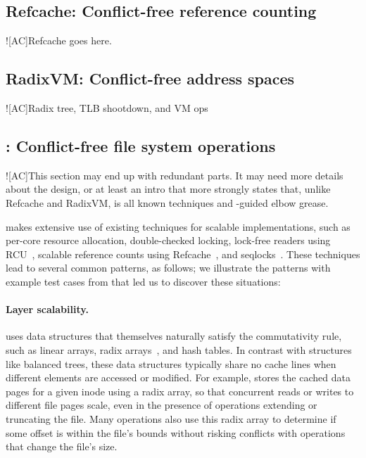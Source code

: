 \subsection{Refcache: Conflict-free reference counting}

\XXX![AC]{Refcache goes here.}

\subsection{RadixVM: Conflict-free address spaces}

\XXX![AC]{Radix tree, TLB shootdown, and VM ops}

\subsection{\fs: Conflict-free file system operations}

\XXX![AC]{This section may end up with redundant parts.  It may need
  more details about the design, or at least an intro that more
  strongly states that, unlike Refcache and RadixVM, \fs is all known
  techniques and \tool-guided elbow grease.}

\fs makes extensive use of existing techniques for scalable
implementations, such as per-core resource
allocation, double-checked locking, lock-free readers using
RCU~\cite{rcu:linux},
scalable reference counts using Refcache~\cite{clements:radixvm},
and seqlocks~\cite[\S6]{lameter:linuxsync}.  These techniques lead to
several common patterns, as follows; we illustrate the patterns with
example test cases from \tool{} that led us to discover these situations:


\paragraph{Layer scalability.}  \fs uses data structures that
themselves naturally satisfy the commutativity rule, such as linear
arrays, radix arrays~\cite{clements:radixvm}, and hash tables.  In
contrast with structures like balanced trees, these data
structures
typically share no cache lines when different elements are accessed
or modified.  For example, \fs stores the cached data pages for a given inode
using a radix array, so that concurrent reads or writes to different
file pages scale, even in the presence of operations
extending or truncating the file.
Many operations also use this radix array to determine if some offset
is within the file's bounds without risking conflicts with operations
that change the file's size.

